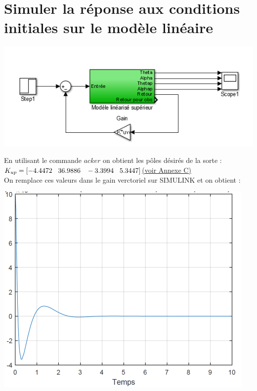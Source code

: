 \documentclass[12pt, a4paper, openany]{report}
\begin{document}
    \section{Simuler la réponse aux conditions initiales sur le modèle linéaire}          
       
\begin{center}
\includegraphics[scale=0.6]{oon.png}
\label{fig7}
\end{center}

En utilisant le commande $acker$ on obtient les pôles désirés de la sorte : $ K_{up} = [-4.4472 \hspace{3mm}36.9886 \hspace{3mm} -3.3994 \hspace{3mm} 5.3447] $\hyperref[section1.111]{(voir Annexe C)}\label{annexe111}\\
On remplace ces valeurs dans le gain verctoriel sur SIMULINK et on obtient : 
  
\begin{center}
\includegraphics[scale=0.7]{figue2.png}
\label{fig8}
\end{center}
\end{document}
